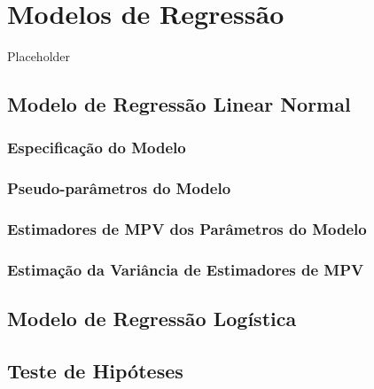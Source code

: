 \documentclass[
]{book}
\begin{document}
\hypertarget{modreg}{%
\chapter{Modelos de Regressão}\label{modreg}}

Placeholder

\hypertarget{modlinear}{%
\section{Modelo de Regressão Linear Normal}\label{modlinear}}

\hypertarget{especificauxe7uxe3o-do-modelo}{%
\subsection{Especificação do Modelo}\label{especificauxe7uxe3o-do-modelo}}

\hypertarget{pseudo-paruxe2metros-do-modelo}{%
\subsection{Pseudo-parâmetros do Modelo}\label{pseudo-paruxe2metros-do-modelo}}

\hypertarget{estimadores-de-mpv-dos-paruxe2metros-do-modelo}{%
\subsection{Estimadores de MPV dos Parâmetros do Modelo}\label{estimadores-de-mpv-dos-paruxe2metros-do-modelo}}

\hypertarget{estimauxe7uxe3o-da-variuxe2ncia-de-estimadores-de-mpv}{%
\subsection{Estimação da Variância de Estimadores de MPV}\label{estimauxe7uxe3o-da-variuxe2ncia-de-estimadores-de-mpv}}

\hypertarget{modlogist}{%
\section{Modelo de Regressão Logística}\label{modlogist}}

\hypertarget{teste-de-hipuxf3teses}{%
\section{Teste de Hipóteses}\label{teste-de-hipuxf3teses}}
\end{document}
